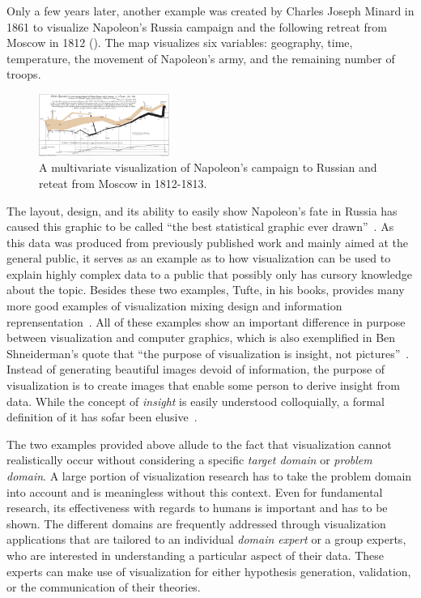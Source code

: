 Only a few years later, another example was created by Charles Joseph Minard in 1861 to visualize Napoleon's Russia campaign and the following retreat from Moscow in 1812 ().  The map visualizes six variables: geography, time, temperature, the movement of Napoleon's army, and the remaining number of troops.
\begin{figure}
    \includegraphics[width=0.38\textwidth]{figures/motivation/napoleon.png}
    \caption{A multivariate visualization of Napoleon's campaign to Russian and reteat from Moscow in 1812-1813.}
    \label{fig:motivation:example:napoleon}
\end{figure}
\noindent \hspace*{-2.5mm} The layout, design, and its ability to easily show Napoleon's fate in Russia has caused this graphic to be called ``the best statistical graphic ever drawn''~\cite{tufte1983visual}.  As this data was produced from previously published work and mainly aimed at the general public, it serves as an example as to how visualization can be used to explain highly complex data to a public that possibly only has cursory knowledge about the topic.  Besides these two examples, Tufte, in his books, provides many more good examples of visualization mixing design and information reprensentation~\cite{tufte1991envisioning}.  All of these examples show an important difference in purpose between visualization and computer graphics, which is also exemplified in Ben Shneiderman's quote that ``the purpose of visualization is insight, not pictures''~\cite{card1999readings}.  Instead of generating beautiful images devoid of information, the purpose of visualization is to create images that enable some person to derive insight from data.  While the concept of \emph{insight} is easily understood colloquially, a formal definition of it has sofar been elusive~\cite{north2006toward}.

The two examples provided above allude to the fact that visualization cannot realistically occur without considering a specific \emph{target domain} or \emph{problem domain}.  A large portion of visualization research has to take the problem domain into account and is meaningless without this context.  Even for fundamental research, its effectiveness with regards to humans is important and has to be shown.  The different domains are frequently addressed through visualization applications that are tailored to an individual \emph{domain expert} or a group experts, who are interested in understanding a particular aspect of their data.  These experts can make use of visualization for either hypothesis generation, validation, or the communication of their theories.

